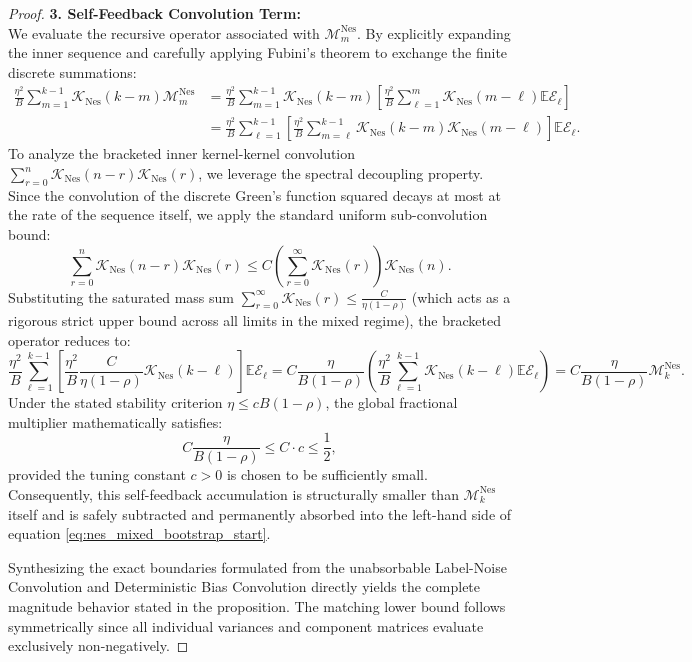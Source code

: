 \begin{proof}
\textbf{3. Self-Feedback Convolution Term:} \\
We evaluate the recursive operator associated with $\mathcal M_m^{\mathrm{Nes}}$. By explicitly expanding the inner sequence and carefully applying Fubini's theorem to exchange the finite discrete summations:
\begin{align*}
    \frac{\eta^2}{B}\sum_{m=1}^{k-1}\mathcal K_{\mathrm{Nes}}(k-m)\mathcal M_m^{\mathrm{Nes}} 
    &= \frac{\eta^2}{B}\sum_{m=1}^{k-1} \mathcal K_{\mathrm{Nes}}(k-m) \left[ \frac{\eta^2}{B}\sum_{\ell=1}^{m} \mathcal K_{\mathrm{Nes}}(m-\ell) \mathbb{E}\mathcal E_\ell \right] \\
    &= \frac{\eta^2}{B}\sum_{\ell=1}^{k-1} \left[ \frac{\eta^2}{B}\sum_{m=\ell}^{k-1} \mathcal K_{\mathrm{Nes}}(k-m)\mathcal K_{\mathrm{Nes}}(m-\ell) \right] \mathbb{E}\mathcal E_\ell.
\end{align*}
To analyze the bracketed inner kernel-kernel convolution $\sum_{r=0}^{n} \mathcal K_{\mathrm{Nes}}(n-r)\mathcal K_{\mathrm{Nes}}(r)$, we leverage the spectral decoupling property. Since the convolution of the discrete Green's function squared decays at most at the rate of the sequence itself, we apply the standard uniform sub-convolution bound:
\begin{equation*}
    \sum_{r=0}^n \mathcal K_{\mathrm{Nes}}(n-r)\mathcal K_{\mathrm{Nes}}(r) \le C \left( \sum_{r=0}^{\infty} \mathcal K_{\mathrm{Nes}}(r) \right) \mathcal K_{\mathrm{Nes}}(n).
\end{equation*}
Substituting the saturated mass sum $\sum_{r=0}^{\infty} \mathcal{K}_{\mathrm{Nes}}(r) \le \frac{C}{\eta(1-\rho)}$ (which acts as a rigorous strict upper bound across all limits in the mixed regime), the bracketed operator reduces to:
\begin{equation*}
    \frac{\eta^2}{B}\sum_{\ell=1}^{k-1} \left[ \frac{\eta^2}{B} \frac{C}{\eta(1-\rho)} \mathcal K_{\mathrm{Nes}}(k-\ell) \right] \mathbb{E}\mathcal E_\ell = C \frac{\eta}{B(1-\rho)} \left( \frac{\eta^2}{B} \sum_{\ell=1}^{k-1} \mathcal K_{\mathrm{Nes}}(k-\ell) \mathbb{E}\mathcal E_\ell \right) = C \frac{\eta}{B(1-\rho)} \mathcal M_k^{\mathrm{Nes}}.
\end{equation*}
Under the stated stability criterion $\eta \le cB(1-\rho)$, the global fractional multiplier mathematically satisfies:
\begin{equation*}
    C \frac{\eta}{B(1-\rho)} \le C \cdot c \le \frac{1}{2},
\end{equation*}
provided the tuning constant $c>0$ is chosen to be sufficiently small. Consequently, this self-feedback accumulation is structurally smaller than $\mathcal M_k^{\mathrm{Nes}}$ itself and is safely subtracted and permanently absorbed into the left-hand side of equation \eqref{eq:nes_mixed_bootstrap_start}.

Synthesizing the exact boundaries formulated from the unabsorbable Label-Noise Convolution and Deterministic Bias Convolution directly yields the complete magnitude behavior stated in the proposition. The matching lower bound follows symmetrically since all individual variances and component matrices evaluate exclusively non-negatively.
\end{proof}

